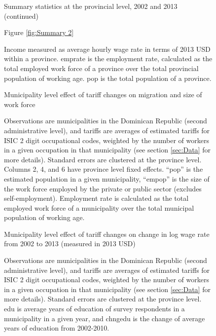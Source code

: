 \documentclass[12pt]{article}
\begin{document}
\begin{figure}[H]
\begin{center}
Summary statistics at the provincial level, 2002 and 2013 (continued)

Figure \ref{fig:Summary 2}
\end{center}
Income measured
as average hourly wage rate in terms of 2013 USD within a province.
emprate is the employment rate, calculated as the total employed work force of a province
over the total provincial population of working age.
pop is the total population of a province.
\end{figure}

\begin{landscape}
\begin{figure}[H]
\begin{center}
Municipality level effect of tariff changes on migration and size of work force

\caption{\label{fig:Table3}}
\end{center}
Observations are municipalities in the Dominican Republic (second administrative level),
and tariffs are averages of estimated tariffs for ISIC 2 digit occupational codes,
weighted by the number of workers in a given occupation in that municipality 
(see section \ref{sec:Data} for more details). Standard errors are clustered at the province level.
Columns 2, 4, and 6 have province level fixed effects.
``pop'' is the estimated population in a given municipality, ``empop'' is the size of
the work force employed by the private or public sector (excludes self-employment).
Employment rate is calculated as the total employed work force of a municipality
over the total municipal population of working age.
\end{figure}

\begin{figure}[H]
\begin{center}
Municipality level effect of tariff changes on change in log wage rate from 2002 to 2013 (measured
in 2013 USD)

\caption{\label{fig:Table1}}
\end{center}
Observations are municipalities in the Dominican Republic (second administrative level),
and tariffs are averages of estimated tariffs for ISIC 2 digit occupational codes,
weighted by the number of workers in a given occupation in that municipality 
(see section \ref{sec:Data} for more details). Standard errors are clustered at the province level.
edu is average years of education of survey respondents in a municipality in a given year,
and chngedu is the change of average years of education from 2002-2010.


\end{figure}
\end{landscape}
\end{document}
